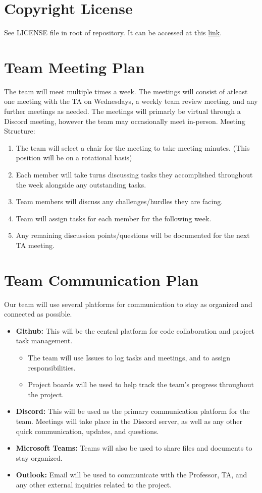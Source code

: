\documentclass{article}
\begin{document}
\section{Copyright License}

See LICENSE file in root of repository. It can be accessed at this
\href{https://github.com/hitchly/hitchly/blob/main/LICENSE}{link}.

\section{Team Meeting Plan}

The team will meet multiple times a week. The meetings will consist of atleast
one meeting with the TA on Wednesdays, a weekly team review meeting, and any 
further meetings as needed. The meetings will primarly be virtual through a Discord
meeting, however the team may occasionally meet in-person.
Meeting Structure:
\begin{enumerate}
  \item The team will select a chair for the meeting to take meeting minutes. (This position will be on a rotational basis) 
  \item Each member will take turns discussing tasks they accomplished throughout the week alongside any outstanding tasks.
  \item Team members will discuss any challenges/hurdles they are facing.
  \item Team will assign tasks for each member for the following week.
  \item Any remaining discussion points/questions will be documented for the next TA meeting.
\end{enumerate}

\section{Team Communication Plan}

Our team will use several platforms for communication to stay as organized and connected as possible.
\begin{itemize}
	\item {\bf Github:} This will be the central platform for code collaboration and project task management. 
	\begin{itemize}
    \item The team will use Issues to log tasks and meetings, and to assign responsibilities.
    \item Project boards will be used to help track the team's progress throughout the project.
  \end{itemize}
  \item {\bf Discord:} This will be used as the primary communication platform for the team. 
        Meetings will take place in the Discord server, as well as any other quick communication, updates, and questions.
  \item {\bf Microsoft Teams:} Teams will also be used to share files and documents to stay organized.
  \item {\bf Outlook:} Email will be used to communicate with the Professor, TA, and any other external inquiries related to the project.
\end{itemize}
\end{document}
